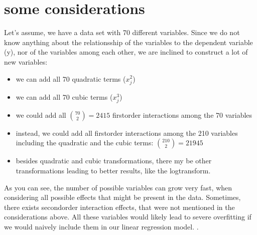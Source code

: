 \documentclass[letterpaper,10pt,english]{jupyterBook}
\begin{document}
\section{some considerations}
\label{\detokenize{Regression_Techniques:some-considerations}}
\sphinxAtStartPar
Let’s assume, we have a data set with 70 different variables. Since we do not know anything about the relationsship of the variables to the dependent variable (y), nor of the variables among each other, we are inclined to construct a lot of new variables:
\begin{itemize}
\item {} 
\sphinxAtStartPar
we can add all 70 quadratic terms (\(x_j^2\))

\item {} 
\sphinxAtStartPar
we can add all 70 cubic terms (\(x_j^3\))

\item {} 
\sphinxAtStartPar
we could add all \(\binom{70}{2} = 2415\) first\sphinxhyphen{}order interactions among the 70 variables

\item {} 
\sphinxAtStartPar
instead, we could add all first\sphinxhyphen{}order interactions among the 210 variables including the quadratic and the cubic terms: \(\binom{210}{2} = 21945\)

\item {} 
\sphinxAtStartPar
besides quadratic and cubic transformations, there my be other transformations leading to better results, like the log\sphinxhyphen{}transform.

\end{itemize}

\sphinxAtStartPar
As you can see, the number of possible variables can grow very fast, when considering all possible effects that might be present in the data. Sometimes, there exists second\sphinxhyphen{}order interaction effects, that were not mentioned in the considerations above.
All these variables would likely lead to severe overfitting if we would naively include them in our linear regression model. .
\end{document}
